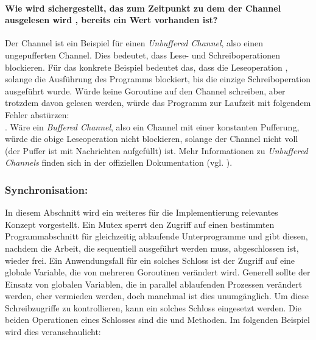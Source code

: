 \noindent
\paragraph{Wie wird sichergestellt, das zum Zeitpunkt zu dem der Channel  ausgelesen wird , bereits ein Wert vorhanden ist?} Der  Channel ist ein Beispiel für einen \textit{Unbuffered Channel}, also einen ungepufferten Channel. Dies bedeutet, dass Lese- und Schreiboperationen blockieren. Für das konkrete Beispiel bedeutet das, dass die Leseoperation , solange die Ausführung des Programms blockiert, bis die einzige Schreiboperation  ausgeführt wurde.  Würde keine Goroutine auf den  Channel schreiben, aber trotzdem davon gelesen werden, würde das Programm zur Laufzeit mit folgendem Fehler abstürzen:\\ . Wäre  ein \textit{Buffered Channel}, also ein Channel mit einer konstanten Pufferung, würde die obige Leseoperation nicht blockieren, solange der Channel nicht voll (der Puffer ist mit Nachrichten aufgefüllt) ist. Mehr Informationen zu \textit{Unbuffered Channels} finden sich in der offiziellen Dokumentation (vgl. \cite{go:tour:concurrency}).\\ 

\newpage
\subsubsection{Synchronisation: }\label{sec:tech:go:sync:mutex}
In diesem Abschnitt wird ein weiteres für die Implementierung relevantes Konzept vorgestellt. Ein Mutex sperrt den Zugriff auf einen bestimmten Programmabschnitt für gleichzeitig ablaufende Unterprogramme und gibt diesen, nachdem die Arbeit, die sequentiell ausgeführt werden muss, abgeschlossen ist, wieder frei. Ein Anwendungsfall für ein solches Schloss ist der Zugriff auf eine globale Variable, die von mehreren Goroutinen verändert wird. Generell sollte der Einsatz von globalen Variablen, die in parallel ablaufenden Prozessen verändert werden, eher vermieden werden, doch manchmal ist dies unumgänglich. Um diese Schreibzugriffe zu kontrollieren, kann ein solches Schloss eingesetzt werden. Die beiden Operationen eines Schlosses sind die  und  Methoden. Im folgenden Beispiel wird dies veranschaulicht:


